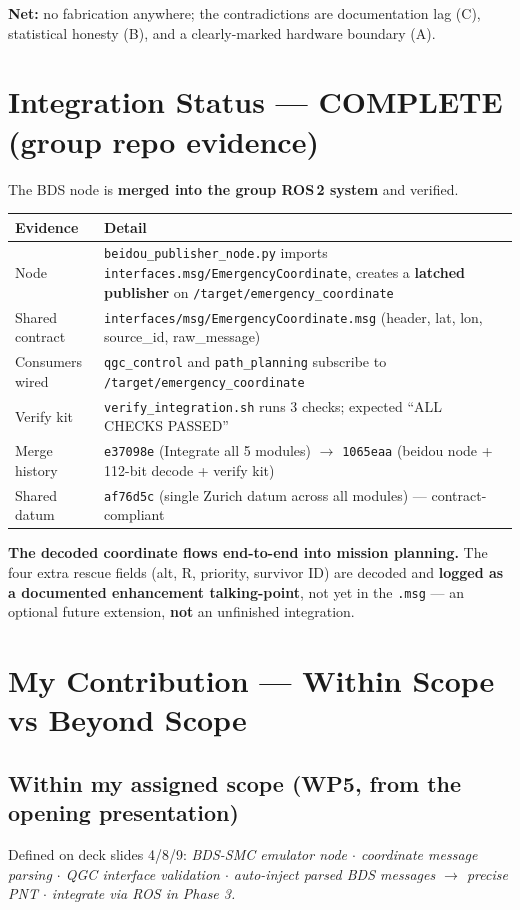 \documentclass[11pt,a4paper]{article}
\begin{document}
\textbf{Net:} no fabrication anywhere; the contradictions are documentation lag (C),
statistical honesty (B), and a clearly-marked hardware boundary (A).

\section{Integration Status --- COMPLETE (group repo evidence)}

The BDS node is \textbf{merged into the group ROS\,2 system} and verified.

\begin{longtable}{@{}p{3.4cm} p{10.4cm}@{}}
\toprule
\textbf{Evidence} & \textbf{Detail} \\
\midrule
\endhead
Node & \texttt{beidou\_publisher\_node.py} imports \texttt{interfaces.msg/EmergencyCoordinate}, creates a \textbf{latched publisher} on \texttt{/target/emergency\_coordinate} \\
Shared contract & \texttt{interfaces/msg/EmergencyCoordinate.msg} (header, lat, lon, source\_id, raw\_message) \\
Consumers wired & \texttt{qgc\_control} and \texttt{path\_planning} subscribe to \texttt{/target/emergency\_coordinate} \\
Verify kit & \texttt{verify\_integration.sh} runs 3 checks; expected ``ALL CHECKS PASSED'' \\
Merge history & \texttt{e37098e} (Integrate all 5 modules) $\to$ \texttt{1065eaa} (beidou node + 112-bit decode + verify kit) \\
Shared datum & \texttt{af76d5c} (single Zurich datum across all modules) --- contract-compliant \\
\bottomrule
\end{longtable}

\textbf{The decoded coordinate flows end-to-end into mission planning.} The four extra
rescue fields (alt, R, priority, survivor ID) are decoded and \textbf{logged as a documented
enhancement talking-point}, not yet in the \texttt{.msg} --- an optional future extension,
\textbf{not} an unfinished integration.

\section{My Contribution --- Within Scope vs Beyond Scope}

\subsection{Within my assigned scope (WP5, from the opening presentation)}
Defined on deck slides 4/8/9: \emph{BDS-SMC emulator node $\cdot$ coordinate message parsing
$\cdot$ QGC interface validation $\cdot$ auto-inject parsed BDS messages $\to$ precise PNT
$\cdot$ integrate via ROS in Phase 3.}
\end{document}

